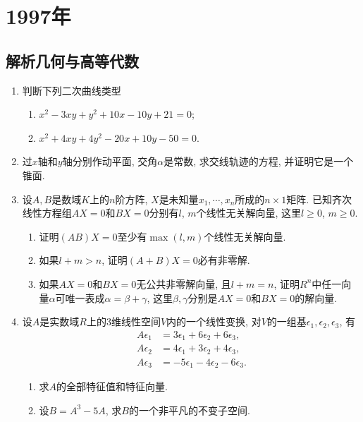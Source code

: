 \documentclass[12pt,a4paper,openany]{book}
\begin{document}
\section{1997年}
\subsection{解析几何与高等代数}
\begin{enumerate}
\item 判断下列二次曲线类型
\begin{enumerate}
\item $x^2 - 3xy + y^2 + 10x - 10y + 21 = 0$;
\item $x^2 + 4xy + 4y^2 - 20x + 10y - 50 = 0$.
\end{enumerate}

\item 过$x$轴和$y$轴分别作动平面, 交角$\alpha$是常数, 求交线轨迹的方程, 并证明它是一个锥面.

\item 设$A, B$是数域$K$上的$n$阶方阵, $X$是未知量$x_1, \cdots, x_n$所成的$n \times 1$矩阵. 已知齐次线性方程组$AX = 0$和$BX = 0$分别有$l$, $m$个线性无关解向量, 这里$l \ge 0$, $m \ge 0$.
\begin{enumerate}
\item 证明$(AB)X = 0$至少有$\max(l, m)$个线性无关解向量.
\item 如果$l + m > n$, 证明$(A + B)X = 0$必有非零解.
\item 如果$AX = 0$和$BX = 0$无公共非零解向量, 且$l + m = n$, 证明$R^n$中任一向量$\alpha$可唯一表成$\alpha = \beta + \gamma$, 这里$\beta, \gamma$分别是$AX = 0$和$BX = 0$的解向量.
\end{enumerate}

\item 设$A$是实数域$R$上的3维线性空间$V$内的一个线性变换, 对$V$的一组基$\epsilon_1, \epsilon_2, \epsilon_3$, 有
\[
\begin{aligned}
A\epsilon_1 &= 3\epsilon_1 + 6\epsilon_2 + 6\epsilon_3, \\
A\epsilon_2 &= 4\epsilon_1 + 3\epsilon_2 + 4\epsilon_3, \\
A\epsilon_3 &= -5\epsilon_1 - 4\epsilon_2 - 6\epsilon_3.
\end{aligned}
\]
\begin{enumerate}
\item 求$A$的全部特征值和特征向量.
\item 设$B = A^3 - 5A$, 求$B$的一个非平凡的不变子空间.
\end{enumerate}


\end{enumerate}
\end{document}
